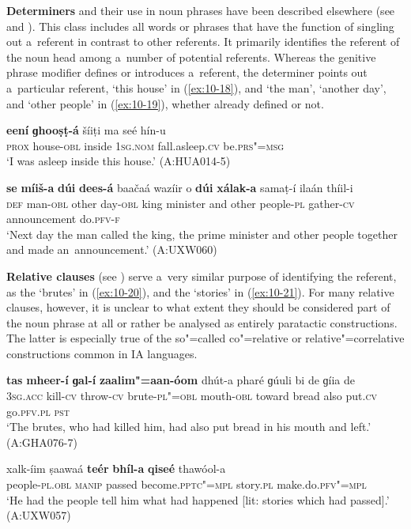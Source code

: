 \textbf{Determiners} and their use in noun phrases have been described elsewhere (see  and ). This class includes all words or phrases that have the function of singling out a~referent in contrast to other referents. It primarily identifies the referent of the noun head among a~number of potential referents. Whereas the genitive phrase modifier defines or introduces a~referent, the determiner points out a~particular referent, `this house' in (\ref{ex:10-18}), and `the man', `another day', and `other people' in (\ref{ex:10-19}), whether already defined or not.

\begin{exe}
\ex
\label{ex:10-18}
\gll \textbf{eení} \textbf{ɡhooṣṭ-á} šíiṭi ma seé hín-u\\
\textsc{prox} house-\textsc{obl} inside \textsc{1sg.nom} fall.asleep.\textsc{cv} be.\textsc{prs"=msg} \\
\glt `I was asleep inside this house.' (A:HUA014-5)

\ex
\label{ex:10-19}
\gll \textbf{se} \textbf{míiš-a} \textbf{dúi} \textbf{dees-á} baačaá wazíir o \textbf{dúi} \textbf{xálak-a} samaṭ-í ilaán thíil-i \\
\textsc{def} man-\textsc{obl} other day-\textsc{obl} king minister and other  people-\textsc{pl} gather-\textsc{cv} announcement do.\textsc{pfv-f}  \\
\glt `Next day the man called the king, the prime minister and other people together and made an~announcement.' (A:UXW060)
\end{exe}

\textbf{Relative clauses} (see ) serve a~very similar purpose of identifying the referent, as the `brutes' in (\ref{ex:10-20}), and the `stories' in (\ref{ex:10-21}). For many relative clauses, however, it is unclear to what extent they should be considered part of the noun phrase at all or rather be analysed as entirely paratactic constructions. The latter is especially true of the so"=called co"=relative or relative"=correlative constructions common in IA languages. 


\begin{exe}
\ex
\label{ex:10-20}
\gll \textbf{tas} \textbf{mheer-í} \textbf{ɡal-í} \textbf{zaalim"=aan-óom} dhút-a pharé ɡúuli bi de ɡíia de \\
\textsc{3sg.acc} kill-\textsc{cv} throw-\textsc{cv} brute-\textsc{pl"=obl} mouth-\textsc{obl} toward  bread also put.\textsc{cv} go.\textsc{pfv.pl} \textsc{pst} \\
\glt `The brutes, who had killed him, had also put bread in his mouth and left.' (A:GHA076-7)

\ex
\label{ex:10-21}
\gll xalk-íim ṣaawaá \textbf{teér} \textbf{bhíl-a} \textbf{qiseé} thawóol-a\\
people-\textsc{pl.obl} \textsc{manip} passed become.\textsc{pptc"=mpl} story.\textsc{pl} make.do.\textsc{pfv"=mpl}\\
\glt `He had the people tell him what had happened [lit: stories which had passed].' (A:UXW057)
\end{exe}


